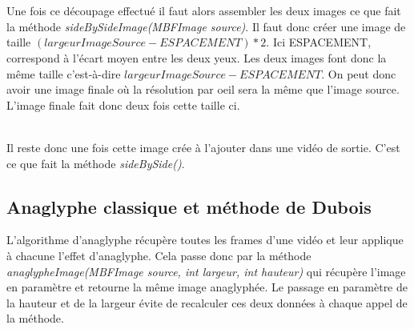 \documentclass[10pt,a4paper]{article}
\begin{document}

~~\\


~~\\

Une fois ce découpage effectué il faut alors assembler les deux images ce que fait la méthode \textit{sideBySideImage(MBFImage source)}.
Il faut donc créer une image de taille $(largeurImageSource - ESPACEMENT) * 2$. Ici ESPACEMENT, correspond à l'écart moyen entre les deux yeux.
Les deux images font donc la même taille c'est-à-dire $largeurImageSource - ESPACEMENT$. On peut donc avoir une image finale où la résolution par oeil sera la même que l'image source. L'image
finale fait donc deux fois cette taille ci.


~~\\

Il reste donc une fois cette image crée à l'ajouter dans une vidéo de sortie. C'est ce que fait la méthode \textit{sideBySide()}.



\subsection{Anaglyphe classique et méthode de Dubois}

L'algorithme d'anaglyphe récupère toutes les frames d'une vidéo et leur applique à chacune l'effet d'anaglyphe. Cela passe donc par la méthode \textit{anaglypheImage(MBFImage source, int largeur, int hauteur)}
qui récupère l'image en paramètre et retourne la même image anaglyphée. Le passage en paramètre de la hauteur et de la largeur évite de recalculer ces deux données à chaque appel de la méthode.
\end{document}
